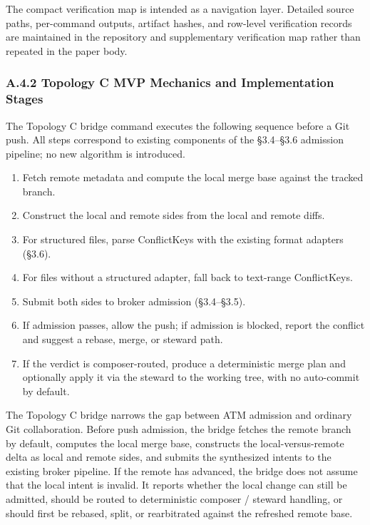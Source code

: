 \documentclass[9pt,letterpaper]{extarticle}
\begin{document}
The compact verification map is intended as a navigation layer. Detailed source paths, per-command outputs, artifact hashes, and row-level verification records are maintained in the repository and supplementary verification map rather than repeated in the paper body.

\subsubsection*{A.4.2 Topology C MVP Mechanics and Implementation Stages}

The Topology C bridge command executes the following sequence before a Git push. All steps correspond to existing components of the §3.4--§3.6 admission pipeline; no new algorithm is introduced.

\begin{enumerate}
\item Fetch remote metadata and compute the local merge base against the tracked branch.
\item Construct the local and remote \texttt{} sides from the local and remote diffs.
\item For structured files, parse ConflictKeys with the existing format adapters (§3.6).
\item For files without a structured adapter, fall back to text-range ConflictKeys.
\item Submit both sides to broker admission (§3.4--§3.5).
\item If admission passes, allow the push; if admission is blocked, report the conflict and suggest a rebase, merge, or steward path.
\item If the verdict is composer-routed, produce a deterministic merge plan and optionally apply it via the steward to the working tree, with no auto-commit by default.
\end{enumerate}

The Topology C bridge narrows the gap between ATM admission and ordinary Git collaboration. Before push admission, the bridge fetches the remote branch by default, computes the local merge base, constructs the local-versus-remote delta as local and remote \texttt{} sides, and submits the synthesized intents to the existing broker pipeline. If the remote has advanced, the bridge does not assume that the local intent is invalid. It reports whether the local change can still be admitted, should be routed to deterministic composer / steward handling, or should first be rebased, split, or rearbitrated against the refreshed remote base.
\end{document}
